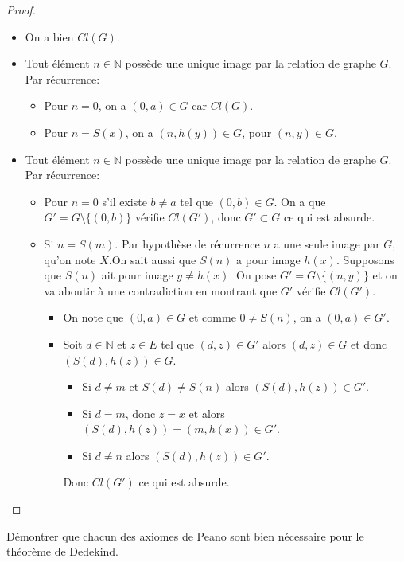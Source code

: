 \begin{proof}
	\begin{itemize}
		\item On a bien $Cl(G)$.
		\item Tout élément $n \in \mathbb{N}$ possède une unique image par la relation de graphe $G$. Par récurrence:
		      \begin{itemize}
			      \item Pour $n = 0$, on a $(0,a) \in G$ car $Cl(G)$.
			      \item Pour $n = S(x)$, on a $(n, h(y)) \in G$, pour $(n,y) \in G$.
		      \end{itemize}
		\item Tout élément $n \in \mathbb{N}$ possède une unique image par la relation de graphe $G$. Par récurrence:
		      \begin{itemize}
			      \item Pour $n = 0$ s'il existe $b \neq a$ tel que $(0,b) \in G$. On a que $G' = G \setminus \{(0,b)\}$ vérifie $Cl(G')$, donc
			            $G' \subset G$ ce qui est absurde.
			      \item Si $n = S(m)$. Par hypothèse de récurrence $n$ a une seule image par $G$, qu'on note $X$.On sait aussi que $S(n)$ a pour image $h(x)$.
			            Supposons que $S(n)$ ait pour image $y \neq h(x)$. On pose $G' = G \setminus \{(n,y)\}$ et on va aboutir à une contradiction en montrant que $G'$ vérifie $Cl(G')$.
			            \begin{itemize}
				            \item On note que $(0,a) \in G$ et comme $0 \neq S(n)$, on a $(0,a) \in G'$.
				            \item Soit $d \in \mathbb{N}$ et $z \in E$ tel que $(d,z) \in G'$ alors $(d,z) \in G$ et donc $(S(d), h(z)) \in G$.
				                  \begin{itemize}
					                  \item Si $d \neq m$ et $S(d) \neq S(n)$ alors $(S(d), h(z)) \in G'$.
					                  \item Si $d = m$, donc $z = x$ et alors $(S(d), h(z)) = (m, h(x)) \in G'$.
					                  \item Si $d \neq n$ alors $(S(d), h(z)) \in G'$.
				                  \end{itemize}
				                  Donc $Cl(G')$ ce qui est absurde.
			            \end{itemize}
		      \end{itemize}
	\end{itemize}
\end{proof}


\begin{exercice}
	Démontrer que chacun des axiomes de Peano sont bien nécessaire pour le théorème de Dedekind.
\end{exercice}

